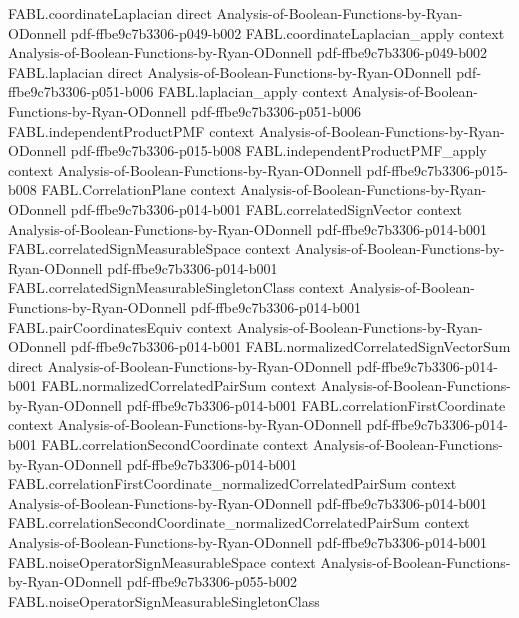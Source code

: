 \begin{theorem}
  {FABL.coordinateLaplacian}
  {direct}
  {Analysis-of-Boolean-Functions-by-Ryan-ODonnell}
  {pdf-ffbe9c7b3306-p049-b002}
\proofstep
  {FABL.coordinateLaplacian_apply}
  {context}
  {Analysis-of-Boolean-Functions-by-Ryan-ODonnell}
  {pdf-ffbe9c7b3306-p049-b002}
\proofstep
  {FABL.laplacian}
  {direct}
  {Analysis-of-Boolean-Functions-by-Ryan-ODonnell}
  {pdf-ffbe9c7b3306-p051-b006}
\proofstep
  {FABL.laplacian_apply}
  {context}
  {Analysis-of-Boolean-Functions-by-Ryan-ODonnell}
  {pdf-ffbe9c7b3306-p051-b006}
\proofstep
  {FABL.independentProductPMF}
  {context}
  {Analysis-of-Boolean-Functions-by-Ryan-ODonnell}
  {pdf-ffbe9c7b3306-p015-b008}
\proofstep
  {FABL.independentProductPMF_apply}
  {context}
  {Analysis-of-Boolean-Functions-by-Ryan-ODonnell}
  {pdf-ffbe9c7b3306-p015-b008}
\proofstep
  {FABL.CorrelationPlane}
  {context}
  {Analysis-of-Boolean-Functions-by-Ryan-ODonnell}
  {pdf-ffbe9c7b3306-p014-b001}
\proofstep
  {FABL.correlatedSignVector}
  {context}
  {Analysis-of-Boolean-Functions-by-Ryan-ODonnell}
  {pdf-ffbe9c7b3306-p014-b001}
\proofstep
  {FABL.correlatedSignMeasurableSpace}
  {context}
  {Analysis-of-Boolean-Functions-by-Ryan-ODonnell}
  {pdf-ffbe9c7b3306-p014-b001}
\proofstep
  {FABL.correlatedSignMeasurableSingletonClass}
  {context}
  {Analysis-of-Boolean-Functions-by-Ryan-ODonnell}
  {pdf-ffbe9c7b3306-p014-b001}
\proofstep
  {FABL.pairCoordinatesEquiv}
  {context}
  {Analysis-of-Boolean-Functions-by-Ryan-ODonnell}
  {pdf-ffbe9c7b3306-p014-b001}
\proofstep
  {FABL.normalizedCorrelatedSignVectorSum}
  {direct}
  {Analysis-of-Boolean-Functions-by-Ryan-ODonnell}
  {pdf-ffbe9c7b3306-p014-b001}
\proofstep
  {FABL.normalizedCorrelatedPairSum}
  {context}
  {Analysis-of-Boolean-Functions-by-Ryan-ODonnell}
  {pdf-ffbe9c7b3306-p014-b001}
\proofstep
  {FABL.correlationFirstCoordinate}
  {context}
  {Analysis-of-Boolean-Functions-by-Ryan-ODonnell}
  {pdf-ffbe9c7b3306-p014-b001}
\proofstep
  {FABL.correlationSecondCoordinate}
  {context}
  {Analysis-of-Boolean-Functions-by-Ryan-ODonnell}
  {pdf-ffbe9c7b3306-p014-b001}
\proofstep
  {FABL.correlationFirstCoordinate_normalizedCorrelatedPairSum}
  {context}
  {Analysis-of-Boolean-Functions-by-Ryan-ODonnell}
  {pdf-ffbe9c7b3306-p014-b001}
\proofstep
  {FABL.correlationSecondCoordinate_normalizedCorrelatedPairSum}
  {context}
  {Analysis-of-Boolean-Functions-by-Ryan-ODonnell}
  {pdf-ffbe9c7b3306-p014-b001}
\proofstep
  {FABL.noiseOperatorSignMeasurableSpace}
  {context}
  {Analysis-of-Boolean-Functions-by-Ryan-ODonnell}
  {pdf-ffbe9c7b3306-p055-b002}
\proofstep
  {FABL.noiseOperatorSignMeasurableSingletonClass}

\end{theorem}
